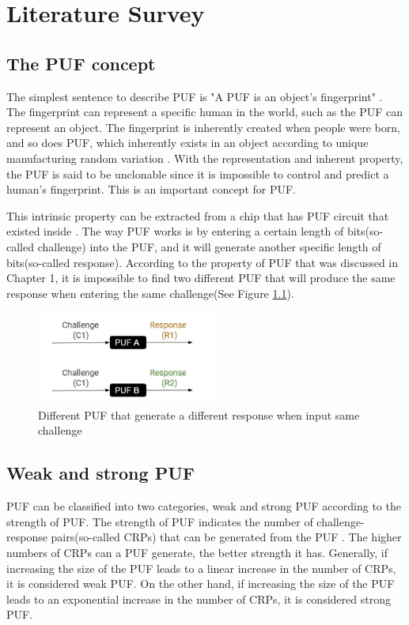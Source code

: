 \chapter{Literature Survey}

\section{The PUF concept}
The simplest sentence to describe PUF is "A PUF is an object's fingerprint" \cite{Reference4}. The fingerprint can represent a specific human in the world, such as the PUF can represent
an object. The fingerprint is inherently created when people were born, and so does PUF, which inherently exists in an object according to unique manufacturing random variation \cite{Reference4}.
With the representation and inherent property, the PUF is said to be unclonable since it is impossible to control and predict a human's fingerprint. This is an important concept for PUF. \par

This intrinsic property can be extracted from a chip that has PUF circuit that existed inside \cite{Reference2}. The way PUF works is by entering a certain length of bits(so-called challenge) into the PUF, and it will
generate another specific length of bits(so-called response). According to the property of PUF that was discussed in Chapter 1, it is impossible to find two different PUF that will produce the same response when entering the same challenge(See Figure \ref{fig:figure1}).
\begin{figure}[htp]
\centering
\includegraphics[width=6cm]{figures/figure1.jpg}
\caption{Different PUF that generate a different response when input same challenge}
\label{fig:figure1}
\end{figure}

\section{Weak and strong PUF}
PUF can be classified into two categories, weak and strong PUF according to the strength of PUF. The strength of PUF indicates the number of challenge-response pairs(so-called CRPs) that can be generated 
from the PUF \cite{Reference1}. The higher numbers of CRPs can a PUF generate, the better strength it has. Generally, if increasing the size of the PUF leads to a linear increase in the number of CRPs, it is considered weak PUF. 
On the other hand, if increasing the size of the PUF leads to an exponential increase in the number of CRPs, it is considered strong PUF.\par


